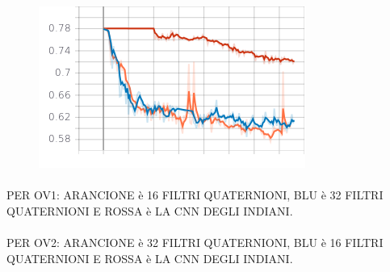 \documentclass{article}
\begin{document}
\begin{figure}[hbt!]
\begin{minipage}{.5\textwidth}
	\end{minipage}%
	\begin{minipage}{.5\textwidth}
	  \centering
	  \includegraphics[width=\linewidth]{images/seld_score_ov2.png}
	\end{minipage}
	\end{figure} 
	\paragraph{}
	PER OV1: ARANCIONE è 16 FILTRI QUATERNIONI, BLU è 32 FILTRI QUATERNIONI E ROSSA è LA CNN DEGLI INDIANI.
	\\ \\
	PER OV2: ARANCIONE è 32 FILTRI QUATERNIONI, BLU è 16 FILTRI QUATERNIONI E ROSSA è LA CNN DEGLI INDIANI.
	
\end{document}
